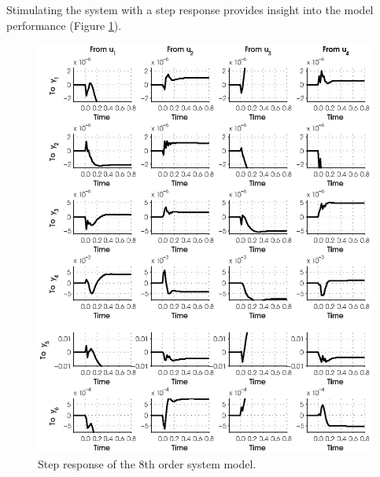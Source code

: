 Stimulating the system with a step response provides insight into the model performance (Figure \ref{fig:5_step}).
\begin{figure}[htb!]\label{fig:5_step}
	\centering
	\includegraphics{../fig/step_resp_parsim.eps}
	\caption{Step response of the 8th order system model.}
\end{figure}






